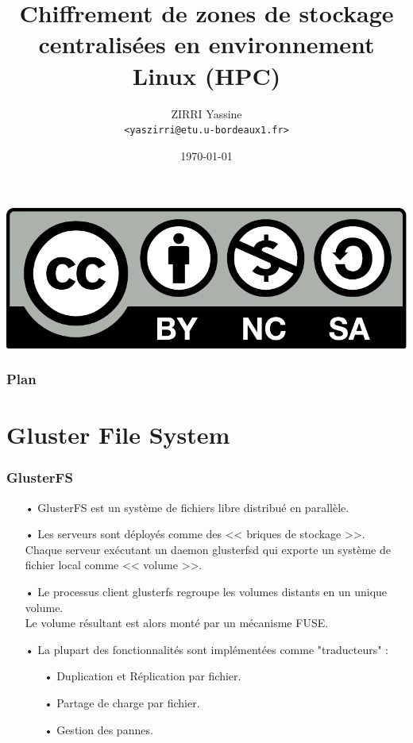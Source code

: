 \documentclass[10pt,a4paper]{beamer}
\title{Chiffrement de zones de stockage centralisées en environnement Linux (HPC)}
\author[ZIRRI Yassine]{ZIRRI Yassine\\[-.25em]
\texttt{\scriptsize <yaszirri@etu.u-bordeaux1.fr>}}
\institute[Master CSI, France]{Master CSI, Université de Bordeaux, France}
\date{\today}
\begin{document}
\begin{frame}
  \vspace{3.5em}
  \titlepage

  \begin{center}
    \includegraphics[scale=.2]{cc-by-nc-sa.pdf}
  \end{center}
\end{frame}

\begin{frame}
  \frametitle{Plan}
  \tableofcontents[subsectionstyle=hide]
\end{frame}

\section{Gluster File System}

\begin{frame}
  \frametitle{GlusterFS}

\begin{itemize}
\item[•] GlusterFS est un système de fichiers libre distribué en parallèle.
\vfill
\item[•] Les serveurs sont déployés comme des << briques de stockage >>.\\
Chaque serveur exécutant un daemon glusterfsd qui exporte un système de fichier local comme << volume >>.
\vfill
\item[•] Le processus client glusterfs regroupe les volumes distants en un unique volume.\\
Le volume résultant est alors monté par un mécanisme FUSE.
\vfill
\item[•] La plupart des fonctionnalités sont implémentées comme "traducteurs" :\\
\begin{itemize}
\item[•] Duplication et Réplication par fichier.
\item[•] Partage de charge par fichier.
\item[•] Gestion des pannes.
\end{itemize}
\vfill
\end{itemize}

\end{frame}
\end{document}
